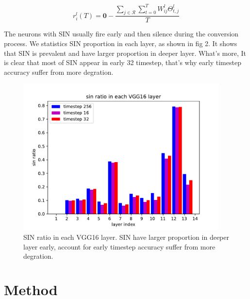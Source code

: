 \documentclass{article}
\begin{document}
\begin{equation}
  r_i^l(T) = \mathbf{0} - \frac{\sum_{j \in \mathcal{R}} \sum_{t=0}^TW_{ij}^l\Theta_{t,j}^l }{T}
\end{equation}

The neurons with SIN usually fire early and then silence during the conversion process.
We statistics SIN proportion in each layer, as shown in fig 2. It shows that SIN is prevalent and have larger proportion in deeper layer.
What's more, It is clear that most of SIN appear in early 32 timestep, that's why early timestep accuracy suffer from more degration.
\begin{figure}[htbp]
  \centering
  \includegraphics[width=0.95\textwidth]{./fig/sin_ratio.pdf}
  \caption{SIN ratio in each VGG16 layer. SIN have larger proportion in deeper layer early, account for early timestep accuracy suffer from more degration.}
\end{figure}

\section{Method}
\end{document}
